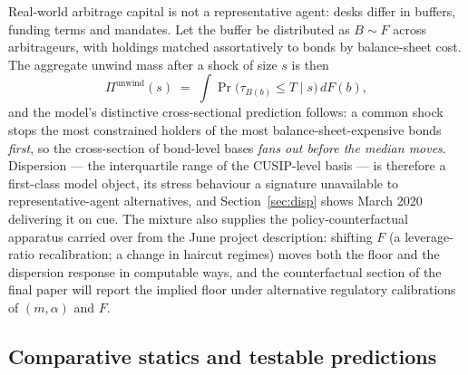 \documentclass[11pt]{article}
\begin{document}
Real-world arbitrage capital is not a representative agent: desks differ in buffers, funding terms and mandates. Let the buffer be distributed as $B\sim F$ across arbitrageurs, with holdings matched assortatively to bonds by balance-sheet cost. The aggregate unwind mass after a shock of size $s$ is then
\begin{equation}
\Pi^{\text{unwind}}(s) \;=\; \int \Pr\!\big(\tau_{B(b)}\le T \mid s\big)\, dF(b),
\label{eq:mixture}
\end{equation}
and the model's distinctive cross-sectional prediction follows: a common shock stops the most constrained holders of the most balance-sheet-expensive bonds \emph{first}, so the cross-section of bond-level bases \emph{fans out before the median moves}. Dispersion --- the interquartile range of the CUSIP-level basis --- is therefore a first-class model object, its stress behaviour a signature unavailable to representative-agent alternatives, and Section~\ref{sec:disp} shows March 2020 delivering it on cue. The mixture also supplies the policy-counterfactual apparatus carried over from the June project description: shifting $F$ (a leverage-ratio recalibration; a change in haircut regimes) moves both the floor and the dispersion response in computable ways, and the counterfactual section of the final paper will report the implied floor under alternative regulatory calibrations of $(m,\alpha)$ and $F$.

\subsection{Comparative statics and testable predictions}
\end{document}

